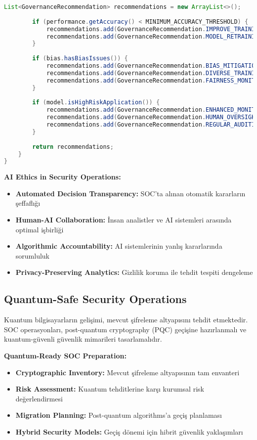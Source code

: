 \begin{lstlisting}[breaklines=true,basicstyle=\ttfamily\footnotesize,language=Java]
        List<GovernanceRecommendation> recommendations = new ArrayList<>();
        
        if (performance.getAccuracy() < MINIMUM_ACCURACY_THRESHOLD) {
            recommendations.add(GovernanceRecommendation.IMPROVE_TRAINING_DATA);
            recommendations.add(GovernanceRecommendation.MODEL_RETRAINING_REQUIRED);
        }
        
        if (bias.hasBiasIssues()) {
            recommendations.add(GovernanceRecommendation.BIAS_MITIGATION_REQUIRED);
            recommendations.add(GovernanceRecommendation.DIVERSE_TRAINING_DATA);
            recommendations.add(GovernanceRecommendation.FAIRNESS_MONITORING);
        }
        
        if (model.isHighRiskApplication()) {
            recommendations.add(GovernanceRecommendation.ENHANCED_MONITORING);
            recommendations.add(GovernanceRecommendation.HUMAN_OVERSIGHT_REQUIRED);
            recommendations.add(GovernanceRecommendation.REGULAR_AUDITING);
        }
        
        return recommendations;
    }
}
\end{lstlisting}

\textbf{AI Ethics in Security Operations:}
\begin{itemize}
    \item \textbf{Automated Decision Transparency:} SOC'ta alınan otomatik kararların şeffaflığı
    \item \textbf{Human-AI Collaboration:} İnsan analistler ve AI sistemleri arasında optimal işbirliği
    \item \textbf{Algorithmic Accountability:} AI sistemlerinin yanlış kararlarında sorumluluk
    \item \textbf{Privacy-Preserving Analytics:} Gizlilik koruma ile tehdit tespiti dengeleme
\end{itemize}

\subsection{Quantum-Safe Security Operations}

Kuantum bilgisayarların gelişimi, mevcut şifreleme altyapısını tehdit etmektedir. SOC operasyonları, post-quantum cryptography (PQC) geçişine hazırlanmalı ve kuantum-güvenli güvenlik mimarileri tasarlamalıdır.

\textbf{Quantum-Ready SOC Preparation:}
\begin{itemize}
    \item \textbf{Cryptographic Inventory:} Mevcut şifreleme altyapısının tam envanteri
    \item \textbf{Risk Assessment:} Kuantum tehditlerine karşı kurumsal risk değerlendirmesi
    \item \textbf{Migration Planning:} Post-quantum algorithms'a geçiş planlaması
    \item \textbf{Hybrid Security Models:} Geçiş dönemi için hibrit güvenlik yaklaşımları
\end{itemize}

